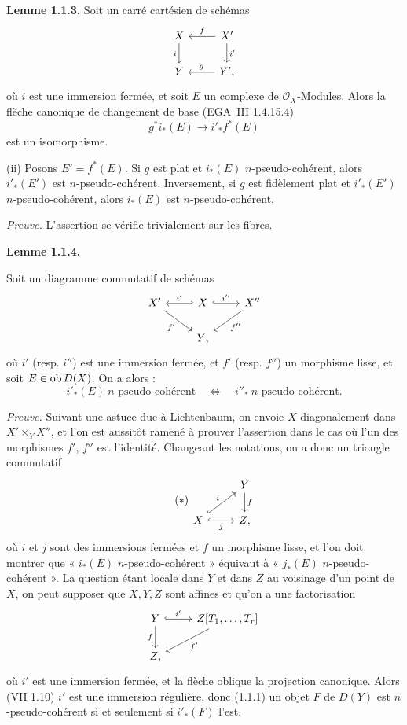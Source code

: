 \documentclass[11pt]{article}
\begin{document}
\textbf{Lemme 1.1.3.} Soit un carré cartésien de schémas
\[
\begin{tikzcd}
X \arrow[d,"i"'] & X' \arrow[l,"f"'] \arrow[d,"i'"]\\
Y & Y'{,} \arrow[l,"g"']
\end{tikzcd}
\]
où \(i\) est une immersion fermée, et soit \(E\) un complexe de \(\mathcal O_X\)-Modules. Alors la flèche canonique de changement de base (EGA~III 1.4.15.4)
\[
  g^*i_*(E)\longrightarrow i'_*f^*(E)
\]
est un isomorphisme.

(ii) Posons \(E'=f^*(E)\). Si \(g\) est plat et \(i_*(E)\) \(n\)-pseudo-cohérent, alors \(i'_*(E')\) est \(n\)-pseudo-cohérent. Inversement, si \(g\) est fidèlement plat et \(i'_*(E')\) \(n\)-pseudo-cohérent, alors \(i_*(E)\) est \(n\)-pseudo-cohérent.

\emph{Preuve.} L'assertion se vérifie trivialement sur les fibres.

\textbf{Lemme 1.1.4.}

Soit un diagramme commutatif de schémas
\[
\begin{tikzcd}
X' \arrow[dr,"f'"'] & X \arrow[l,hook',"i'"'] \arrow[r,hook,"i''"] & X'' \arrow[dl,"f''"]\\
& Y{,} &
\end{tikzcd}
\]
où \(i'\) (resp. \(i''\)) est une immersion fermée, et \(f'\) (resp. \(f''\)) un morphisme lisse, et soit \(E\in\operatorname{ob} D(X)\). On a alors :
\[
  i'_*(E)\ n\text{-pseudo-cohérent}
  \quad\Longleftrightarrow\quad
  i''_*\ n\text{-pseudo-cohérent}.
\]

\emph{Preuve.} Suivant une astuce due à Lichtenbaum, on envoie \(X\) diagonalement dans \(X'\times_YX''\), et l'on est aussitôt ramené à prouver l'assertion dans le cas où l'un des morphismes \(f'\), \(f''\) est l'identité. Changeant les notations, on a donc un triangle commutatif
\begin{equation}\tag{$*$}
\begin{tikzcd}
& Y \arrow[d,"f"]\\
X \arrow[r,hook,"j"'] \arrow[ur,hook,"i"] & Z{,}
\end{tikzcd}
\end{equation}
où \(i\) et \(j\) sont des immersions fermées et \(f\) un morphisme lisse, et l'on doit montrer que « \(i_*(E)\) \(n\)-pseudo-cohérent » équivaut à « \(j_*(E)\) \(n\)-pseudo-cohérent ». La question étant locale dans \(Y\) et dans \(Z\) au voisinage d'un point de \(X\), on peut supposer que \(X,Y,Z\) sont affines et qu'on a une factorisation
\[
\begin{tikzcd}
Y \arrow[r,hook,"i'"] \arrow[d,"f"'] & Z[T_1,\ldots,T_r]\arrow[dl,"f'"]\\
Z{,}&
\end{tikzcd}
\]
où \(i'\) est une immersion fermée, et la flèche oblique la projection canonique. Alors (VII 1.10) \(i'\) est une immersion régulière, donc (1.1.1) un objet \(F\) de \(D(Y)\) est \(n\)-pseudo-cohérent si et seulement si \(i'_*(F)\) l'est.
\end{document}
